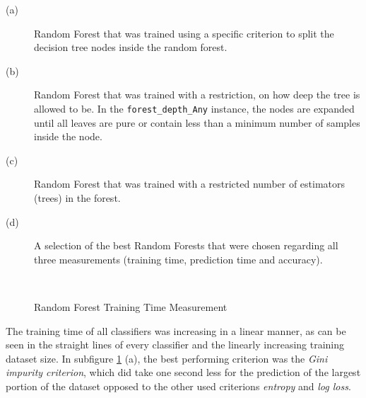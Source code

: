 \documentclass{article}[12pt]
\theoremstyle{mydef}
\begin{document}
            \begin{description}
                \item[(a)] Random Forest that was trained using a specific criterion to split the decision tree nodes inside the random forest.
                \item[(b)] Random Forest that was trained with a restriction, on how deep the tree is allowed to be. In the \texttt{forest\_depth\_Any} instance, 
                the nodes are expanded until all leaves are pure or contain less than a minimum number of samples inside the node.
                \item[(c)] Random Forest that was trained with a restricted number of estimators (trees) in the forest.
                \item[(d)] A selection of the best Random Forests that were chosen regarding all three measurements (training time, prediction time and accuracy).
            \end{description}
            
            
            \begin{figure}[!h]
                \centering
                \quad
                \\
                \quad
                \caption{Random Forest Training Time Measurement}
                \label{fig:random-forest-training-time}
              \end{figure}

            The training time of all classifiers was increasing in a linear manner, 
            as can be seen in the straight lines of every classifier and the linearly increasing training dataset size.
            In subfigure \ref{fig:random-forest-training-time} (a), the best performing criterion was the \emph{Gini impurity criterion}, 
            which did take one second less for the prediction of the largest portion of the dataset opposed to the other used criterions \emph{entropy} and \emph{log loss}.
\end{document}
